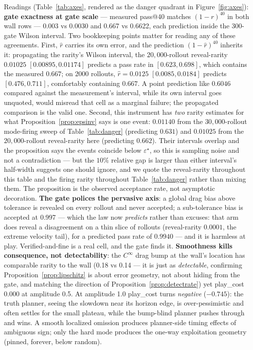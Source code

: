 \documentclass[11pt]{article}
\theoremstyle{definition}
\theoremstyle{remark}
\begin{document}
Readings (Table~\ref{tab:axes}, rendered as the danger quadrant in Figure~\ref{fig:axes}): \textbf{gate exactness at gate scale} --- measured pass@40 matches $(1-r)^{40}$ in both wall rows --- 0.003 vs 0.0030 and 0.667 vs 0.6622, each prediction inside the 300-gate Wilson interval. Two bookkeeping points matter for reading any of these agreements. First, $\hat r$ carries its own error, and the prediction $(1-\hat r)^{40}$ inherits it: propagating the rarity's Wilson interval, the $20{,}000$-rollout reveal-rarity $0.01025$ $[0.00895, 0.01174]$ predicts a pass rate in $[0.623, 0.698]$, which contains the measured $0.667$; on $2000$ rollouts, $\hat r = 0.0125$ $[0.0085, 0.0184]$ predicts $[0.476, 0.711]$, comfortably containing $0.667$. A point prediction like $0.6046$ compared against the measurement's interval, while its own interval goes unquoted, would misread that cell as a marginal failure; the propagated comparison is the valid one. Second, this instrument has \emph{two} rarity estimates for what Proposition~\ref{prop:epsinv} says is one event: $0.01140$ from the $30{,}000$-rollout mode-firing sweep of Table~\ref{tab:danger} (predicting $0.631$) and $0.01025$ from the $20{,}000$-rollout reveal-rarity here (predicting $0.662$). Their intervals overlap and the proposition says the events coincide below $\varepsilon^\star$, so this is sampling noise and not a contradiction --- but the $10\%$ relative gap is larger than either interval's half-width suggests one should ignore, and we quote the reveal-rarity throughout this table and the firing rarity throughout Table~\ref{tab:danger} rather than mixing them. The proposition is the observed acceptance rate, not asymptotic decoration. \textbf{The gate polices the pervasive axis}: a global drag bias above tolerance is revealed on every rollout and never accepted; a sub-tolerance bias is accepted at 0.997 --- which the law now \emph{predicts} rather than excuses: that arm does reveal a disagreement on a thin slice of rollouts (reveal-rarity $0.0001$, the extreme velocity tail), for a predicted pass rate of $0.9940$ --- and it is harmless at play. Verified-and-fine is a real cell, and the gate finds it. \textbf{Smoothness kills consequence, not detectability}: the $C^\infty$ drag bump at the wall's location has comparable rarity to the wall (0.18 vs 0.14 --- it is just as \emph{detectable}, confirming Proposition~\ref{prop:lipschitz} is about error geometry, not about hiding from the gate, and matching the direction of Proposition~\ref{prop:detectrate}) yet play\_cost 0.000 at amplitude 0.5. At amplitude 1.0 play\_cost turns \emph{negative} ($-0.745$): the truth planner, seeing the slowdown near its horizon edge, is over-pessimistic and often settles for the small plateau, while the bump-blind planner pushes through and wins. A smooth localized omission produces planner-side timing effects of ambiguous sign; only the hard mode produces the one-way exploitation geometry (pinned, forever, below random).
\end{document}
